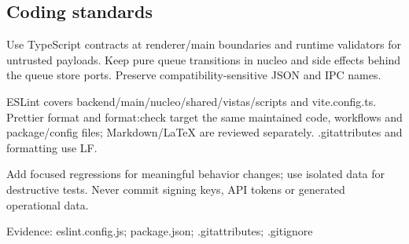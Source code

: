 \subsection{Coding standards}

Use TypeScript contracts at renderer/main boundaries and runtime validators for untrusted payloads. Keep pure queue transitions in nucleo and side effects behind the queue store ports. Preserve compatibility-sensitive JSON and IPC names.

ESLint covers backend/main/nucleo/shared/vistas/scripts and vite.config.ts. Prettier format and format:check target the same maintained code, workflows and package/config files; Markdown/LaTeX are reviewed separately. .gitattributes and formatting use LF.

Add focused regressions for meaningful behavior changes; use isolated data for destructive tests. Never commit signing keys, API tokens or generated operational data.

Evidence: eslint.config.js; package.json; .gitattributes; .gitignore

